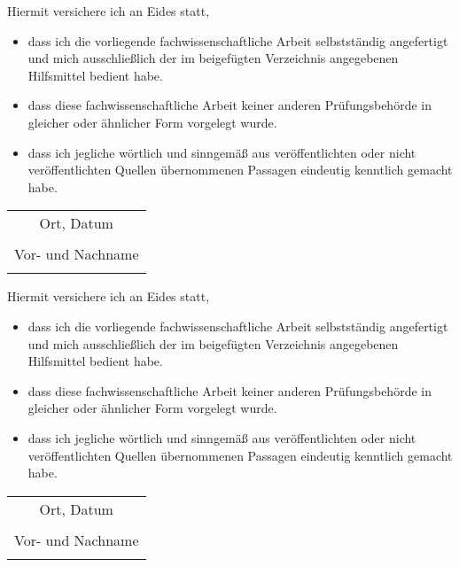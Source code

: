 
Hiermit versichere ich an Eides statt,
\begin{itemize}
  \item dass ich die vorliegende fachwissenschaftliche Arbeit
    selbstständig angefertigt und mich ausschließlich der im
    beigefügten Verzeichnis angegebenen Hilfsmittel bedient habe.
  \item dass diese fachwissenschaftliche Arbeit keiner anderen
    Prüfungsbehörde in gleicher oder ähnlicher Form vorgelegt wurde.
  \item dass ich jegliche wörtlich und sinngemäß aus veröffentlichten
    oder nicht veröffentlichten Quellen übernommenen Passagen
    eindeutig kenntlich gemacht habe.
\end{itemize}
\bigskip
\bigskip
\bigskip
\bigskip
\bigskip

\begin{flushright}
  \begin{tabular}{c}
    Ort, Datum
    \vspace*{1.5cm} \\

    \dotfill \\
    Vor- und Nachname \\
    \hspace{5cm} \\
  \end{tabular}
\end{flushright}


Hiermit versichere ich an Eides statt,
\begin{itemize}
  \item dass ich die vorliegende fachwissenschaftliche Arbeit
    selbstständig angefertigt und mich ausschließlich der im
    beigefügten Verzeichnis angegebenen Hilfsmittel bedient habe.
  \item dass diese fachwissenschaftliche Arbeit keiner anderen
    Prüfungsbehörde in gleicher oder ähnlicher Form vorgelegt wurde.
  \item dass ich jegliche wörtlich und sinngemäß aus veröffentlichten
    oder nicht veröffentlichten Quellen übernommenen Passagen
    eindeutig kenntlich gemacht habe.
\end{itemize}
\bigskip
\bigskip
\bigskip
\bigskip
\bigskip

\begin{flushright}
  \begin{tabular}{c}
    Ort, Datum
    \vspace*{1.5cm} \\

    \dotfill \\
    Vor- und Nachname \\
    \hspace{5cm} \\
  \end{tabular}
\end{flushright}

